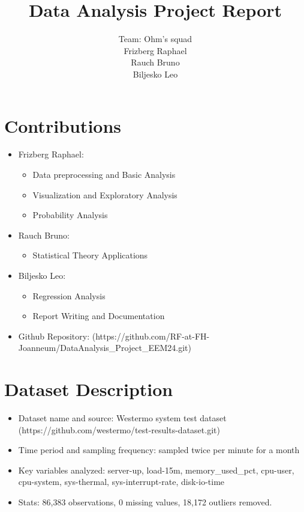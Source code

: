 \documentclass[11pt]{article}
\title{Data Analysis Project Report}
\author{
	Team: Ohm's squad\\ 
	Frizberg Raphael\\
	Rauch Bruno\\
	Biljesko Leo
}
\date{}
\begin{document}
	
	\maketitle
	\section{Contributions}
	\begin{itemize}
		\item Frizberg Raphael:
		\begin{itemize}
			\item Data preprocessing and Basic Analysis
			\item Visualization and Exploratory Analysis
			\item Probability Analysis
		\end{itemize}
		\item Rauch Bruno:
		\begin{itemize}
			\item Statistical Theory Applications
		\end{itemize}
		\item Biljesko Leo:
		\begin{itemize}
			\item Regression Analysis
			\item Report Writing and Documentation
		\end{itemize}
		
			\item Github Repository: (https://github.com/RF-at-FH-Joanneum/DataAnalysis\_Project\_EEM24.git)
		
		
	\end{itemize}
	
	\section{Dataset Description}
	\begin{itemize}
		\item Dataset name and source: Westermo system test dataset (https://github.com/westermo/test-results-dataset.git)
		\item Time period and sampling frequency: sampled twice per minute for a month
		\item Key variables analyzed: server-up, load-15m, memory\_used\_pct, cpu-user, cpu-system, sys-thermal, sys-interrupt-rate, disk-io-time
		\item Stats: 86,383 observations, 0 missing values, 18,172 outliers removed. 
		
	\end{itemize}
	\pagebreak
\end{document}
